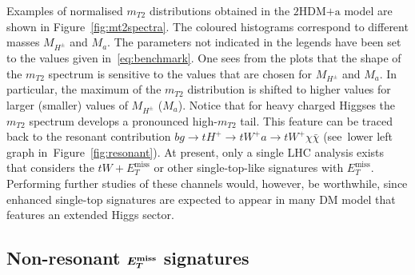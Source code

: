 \documentclass[a4paper, 11pt,notoc]{article}
\newcommand{\MET}{\ensuremath{E_T^\mathrm{miss}}\xspace}
\newcommand{\ma}{\ensuremath{M_{a}}\xspace}
\newcommand{\mHc}{\ensuremath{M_{H^{\pm}}}\xspace}
\newcommand{\hdma}{\ensuremath{\textrm{2HDM+a}}\xspace}
\def\bm#1{\mbox{\boldmath$#1$\unboldmath}}
\begin{document}
Examples of normalised $m_{T2}$ distributions obtained in the \hdma model are shown in Figure~\ref{fig:mt2spectra}. The coloured histograms correspond to different masses $\mHc$ and $\ma$. The parameters not indicated in the legends have been set to the values given in~\eqref{eq:benchmark}. One sees from the plots that the shape of the $m_{T2}$ spectrum is sensitive to the values that are chosen for $\mHc$ and $\ma$. In particular, the maximum of the $m_{T2}$ distribution is shifted to higher values for larger (smaller) values of $\mHc$ ($\ma$). Notice that for heavy charged Higgses the $m_{T2}$ spectrum develops a pronounced high-$m_{T2}$ tail.  This feature can be traced back to the resonant contribution $b g \to t H^+  \to  t W^+ a  \to t W^+ \chi \bar \chi$ (see~lower left graph in~Figure~\ref{fig:resonant}).  At present, only a single LHC analysis exists~\cite{CMS-PAS-EXO-18-010}  that considers the $tW + \MET$  or other single-top-like signatures with $\MET$. Performing further studies of these channels would, however, be worthwhile, since enhanced single-top signatures are expected to appear in many DM model that features an extended Higgs sector. 

\subsection[Non-resonant $E_T^{\rm miss}$ signatures]{Non-resonant $\bm{E_T^{\rm miss}}$ signatures}
\label{sec:nonresonant}
\end{document}
